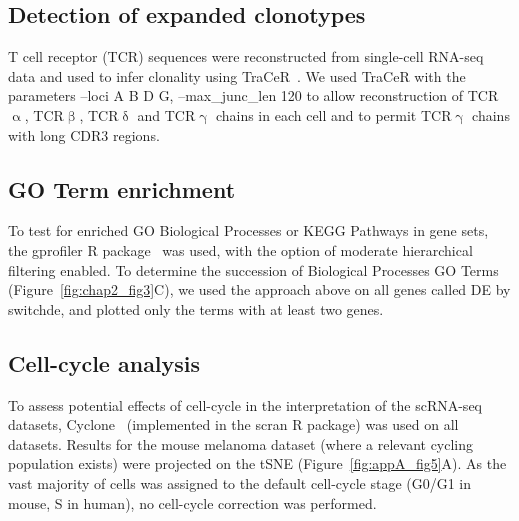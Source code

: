 \subsection{Detection of expanded clonotypes}
T cell receptor (TCR) sequences were reconstructed from single-cell RNA-seq data and used to infer clonality using TraCeR~\citep{stubbington_t_2016}. We used TraCeR with the parameters --loci A B D G, --max\_junc\_len 120 to allow reconstruction of TCR${\upalpha}$, TCR${\upbeta}$, TCR${\updelta}$ and TCR${\upgamma}$ chains in each cell and to permit TCR${\upgamma}$ chains with long CDR3 regions. 

\subsection{GO Term enrichment}
To test for enriched GO Biological Processes or KEGG Pathways in gene sets, the gprofiler R package~\citep{Reimand2016-fj} was used, with the option of moderate hierarchical filtering enabled.
To determine the succession of Biological Processes GO Terms (Figure~\ref{fig:chap2_fig3}C), we used the approach above on all genes called DE by switchde, and plotted only the terms with at least two genes.

\subsection{Cell-cycle analysis}
To assess potential effects of cell-cycle in the interpretation of the scRNA-seq datasets, Cyclone~\citep{Scialdone2015-tw} (implemented in the scran R package) was used on all datasets. Results for the mouse melanoma dataset (where a relevant cycling population exists) were projected on the tSNE (Figure~\ref{fig:appA_fig5}A). As the vast majority of cells was assigned to the default cell-cycle stage (G0/G1 in mouse, S in human), no cell-cycle correction was performed.
